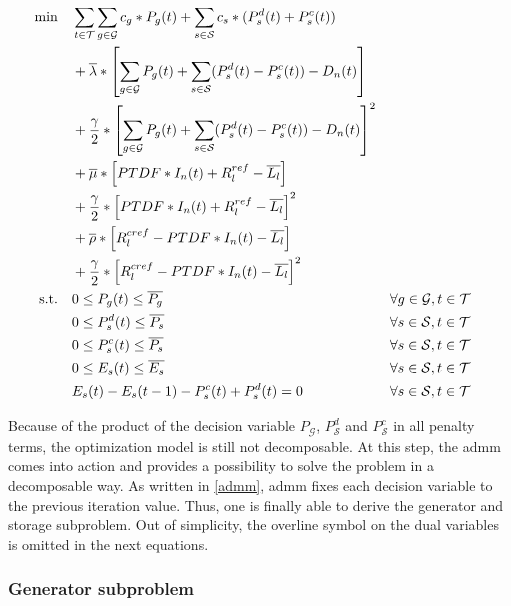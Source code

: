 \begin{subequations}
	\begin{align}
		 \min \quad & \sum_{t\in\mathcal{T}}\sum_{g\in\mathcal{G}}c_g*P_g(t) + \sum_{s\in\mathcal{S}}c_s*(P_s^d(t)+P_s^c(t)) \label{eq:dom:final} \\
		 & + \overline{\lambda} * \left[\sum_{g\in\mathcal{G}}P_g(t) + \sum_{s\in\mathcal{S}}(P_s^d(t)-P_s^c(t))-D_n(t)\right]\nonumber \\
		 & + \frac{\gamma}{2} * \left[\sum_{g\in\mathcal{G}}P_g(t) + \sum_{s\in\mathcal{S}}(P_s^d(t)-P_s^c(t))-D_n(t)\right]^2 \nonumber \\
		 & + \overline{\mu} * \left[PTDF * I_n(t) + R^{ref}_l - \overline{L_l}\right] \nonumber \\
		 & + \frac{\gamma}{2} * \left[PTDF * I_n(t) + R^{ref}_l - \overline{L_l}\right]^2 \nonumber \\
		 & + \overline{\rho} * \left[R^{cref}_l - PTDF * I_n(t) - \overline{L_l}\right]\nonumber \\
		 & + \frac{\gamma}{2} * \left[R^{cref}_l - PTDF * I_n(t) - \overline{L_l}\right]^2\nonumber \\
		 \text{s.t.} \quad & 0 \leq P_g(t) \leq \overline{P_g} && \forall g \in \mathcal{G}, t \in \mathcal{T}\\\
		 & 0 \leq P_s^d(t) \leq \overline{P_s} && \forall s \in \mathcal{S}, t \in \mathcal{T}\\
		 & 0 \leq P_s^c(t) \leq \overline{P_s} && \forall s \in \mathcal{S}, t \in \mathcal{T}\\
		 & 0 \leq E_s(t) \leq \overline{E_s} && \forall s \in \mathcal{S}, t \in \mathcal{T}\\
		 & E_s(t) - E_s(t-1) - P_s^c(t) + P_s^d(t) = 0 && \forall s \in \mathcal{S}, t \in \mathcal{T}
	\end{align}
\end{subequations}

Because of the product of the decision variable $P_{\mathcal{G}}$, $P_{\mathcal{S}}^d$ and $P_{\mathcal{S}}^c$ in all penalty terms, the optimization model is still not decomposable. At this step, the \gls{admm} comes into action and provides a possibility to solve the problem in a decomposable way. As written in \ref{admm}, \gls{admm} fixes each decision variable to the previous iteration value. Thus, one is finally able to derive the generator and storage subproblem. Out of simplicity, the overline symbol on the dual variables is omitted in the next equations.


\subsubsection*{Generator subproblem}

